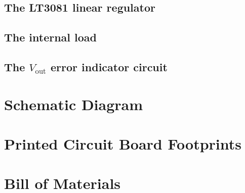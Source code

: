 \documentclass[letterpaper,twocolumn,11pt]{article}
\begin{document}
\subsection{The LT3081 linear regulator}\label{sec:lt3081}

\subsection{The internal load}\label{sec:int_load}

\subsection{The $V_\text{out}$ error indicator circuit}\label{sec:how_offset}

\section{Schematic Diagram}

\section{Printed Circuit Board Footprints}

\section{Bill of Materials}
\end{document}
